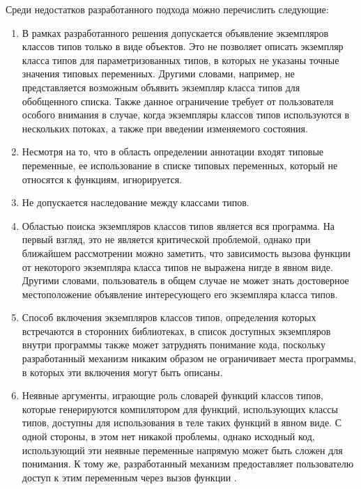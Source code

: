 Среди недостатков разработанного подхода можно перечислить следующие:
\begin{enumerate}
    \item \label{it:flaw-6} В рамках разработанного решения допускается объявление экземпляров классов типов только в виде объектов. Это не позволяет описать экземпляр класса типов для параметризованных типов, в которых не указаны точные значения типовых переменных. Другими словами, например, не представляется возможным объявить экземпляр класса типов для обобщенного списка. Также данное ограничение требует от пользователя особого внимания в случае, когда экземпляры классов типов используются в нескольких потоках, а также при введении изменяемого состояния.  
    \item \label{it:flaw-5} Несмотря на то, что в область определении аннотации  входят типовые переменные, ее использование в списке типовых переменных, который не относятся к функциям, игнорируется. 
    \item \label{it:flaw-4} Не допускается наследование между классами типов. %
    \item \label{it:flaw-1} Областью поиска экземпляров классов типов является вся программа. На первый взгляд, это не является критической проблемой, однако при ближайшем рассмотрении можно заметить, что зависимость вызова функции от некоторого экземпляра класса типов не выражена нигде в явном виде. Другими словами, пользователь в общем случае не может знать достоверное местоположение объявление интересующего его экземпляра класса типов.  
    \item \label{it:flaw-2} Способ включения экземпляров классов типов, определения которых встречаются в сторонних библиотеках, в список доступных экземпляров внутри программы также может затруднять понимание кода, поскольку разработанный механизм никаким образом не ограничивает места программы, в которых эти включения могут быть описаны. 
    \item \label{it:flaw-3} Неявные аргументы, играющие роль словарей функций классов типов, которые генерируются компилятором для функций, использующих классы типов, доступны для использования в теле таких функций в явном виде. С одной стороны, в этом нет никакой проблемы, однако исходный код, использующий эти неявные переменные напрямую может быть сложен для понимания. К тому же, разработанный механизм предоставляет пользователю доступ к этим переменным через вызов функции . 
\end{enumerate}
